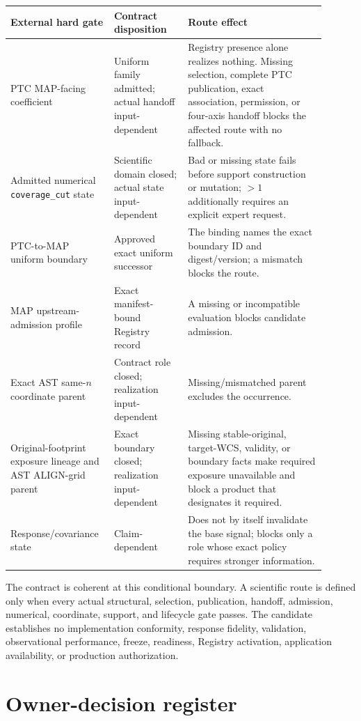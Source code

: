 \documentclass[10pt]{article}
\newcommand{\code}[1]{\nolinkurl{#1}}
\begin{document}
\begin{longtable}{L{0.27\linewidth}L{0.22\linewidth}L{0.41\linewidth}}
\toprule
External hard gate & Contract disposition & Route effect\\
\midrule
PTC MAP-facing coefficient & Uniform family admitted; actual handoff input-dependent & Registry presence alone realizes nothing. Missing selection, complete PTC publication, exact association, permission, or four-axis handoff blocks the affected route with no fallback.\\
Admitted numerical \code{coverage\_cut} state & Scientific domain closed; actual state input-dependent & Bad or missing state fails before support construction or mutation; \(>1\) additionally requires an explicit expert request.\\
PTC-to-MAP uniform boundary & Approved exact uniform successor & The binding names the exact boundary ID and digest/version; a mismatch blocks the route.\\
MAP upstream-admission profile & Exact manifest-bound Registry record & A
missing or incompatible \SCIMapUpstreamProfile{} evaluation blocks candidate
admission.\\
Exact AST same-\(n\) coordinate parent & Contract role closed; realization input-dependent & Missing/mismatched parent excludes the occurrence.\\
Original-footprint exposure lineage and AST ALIGN-grid parent & Exact boundary closed; realization input-dependent & Missing stable-original, target-WCS, validity, or boundary facts make required exposure unavailable and block a product that designates it required.\\
Response/covariance state & Claim-dependent & Does not by itself invalidate the base signal; blocks only a role whose exact policy requires stronger information.\\
\bottomrule
\end{longtable}

The contract is coherent at this conditional boundary. A scientific route is
defined only when every actual structural, selection, publication, handoff,
admission, numerical, coordinate, support, and lifecycle gate passes. The
candidate establishes no implementation conformity, response fidelity,
validation, observational performance, freeze, readiness, Registry activation,
application availability, or production authorization.

\appendix
\clearpage
\section{Owner-decision register}\label{app:owner-decisions}
\end{document}
